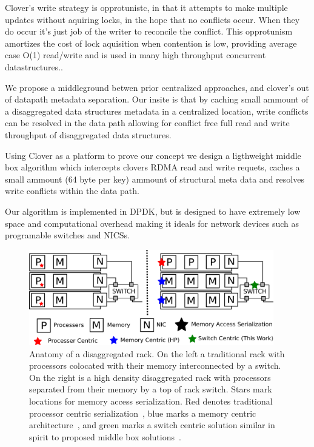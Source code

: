 Clover's write strategy is opprotunistc, in that it attempts to make
multiple updates without aquiring locks, in the hope that no conflicts
occur. When they do occur it's just job of the writer to reconcile the
conflict. This opprotunism amortizes the cost of lock aquisition when
contention is low, providing average case O(1) read/write and is used
in many high throughput concurrent datastructures..

We propose a middleground betwen prior centralized approaches, and
clover's out of datapath metadata separation. Our insite is that by
caching small ammount of a disaggregated data structures metadata in a
centralized location, write conflicts can be resolved in the data path
allowing for conflict free full read and write throughput of
disaggregated data structures.

Using Clover as a platform to prove our concept we design a
ligthweight middle box algorithm which intercepts clovers RDMA read
and write requets, caches a small ammount (64 byte per key) ammount of
structural meta data and resolves write conflicts within the data
path. 

Our algorithm is implemented in DPDK, but is designed to have
extremely low space and computational overhead making it ideals for
network devices such as programable switches and NICSs.




\begin{figure}
      \centering
      \includegraphics[width=0.95\textwidth]{fig/overview.png}
      \caption{Anatomy of a disaggregated rack. On the left a
      traditional rack with processors colocated with their memory
      interconnected by a switch. On the right is a high density
      disaggregated rack with processors separated from their memory
      by a top of rack switch. Stars mark locations for memory access
      serialization. Red denotes traditional processor centric
      serialization~\cite{ memc3, cell, sonuma, storm, clover}, blue marks a
      memory centric architecture~\cite{aguilera2019designing}, and
      green marks a switch centric solution similar in spirit to
      proposed middle box solutions~\cite{254120}.
      \label{fig:overview}
      }
\end{figure}


